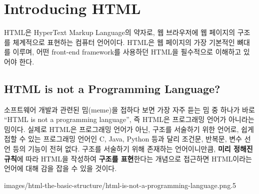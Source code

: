 \section{Introducing HTML} \label{sect:introducing-html}

HTML은 HyperText Markup Language의 약자로, 웹 브라우저에 웹 페이지의 구조를 체계적으로 표현하는 컴퓨터 언어이다. HTML은 웹 페이지의 가장 기본적인 뼈대를 이루며, 어떤 front-end framework를 사용하던 HTML을 필수적으로 이해하고 있어야 한다.

\subsection*{HTML is not a Programming Language?}

소프트웨어 개발과 관련된 밈(meme)을 접하다 보면 가장 자주 듣는 밈 중 하나가 바로 ``HTML is not a programming language'', 즉 HTML은 프로그래밍 언어가 아니라는 밈이다. 실제로 HTML은 프로그래밍 언어가 아닌, 구조를 서술하기 위한 언어로, 쉽게 접할 수 있는 프로그래밍 언어인 C, Java, Python 등과 달리 조건문, 반복문, 변수 선언 등의 기능이 전혀 없다. 구조를 서술하기 위해 존재하는 언어이니만큼, \textbf{미리 정해진 규칙}에 따라 HTML을 작성하여 \textbf{구조를 표현}한다는 개념으로 접근하면 HTML이라는 언어에 대해 감을 잡을 수 있을 것이다.

    {images/html-the-basic-structure/html-is-not-a-programming-language.png}{.5}

